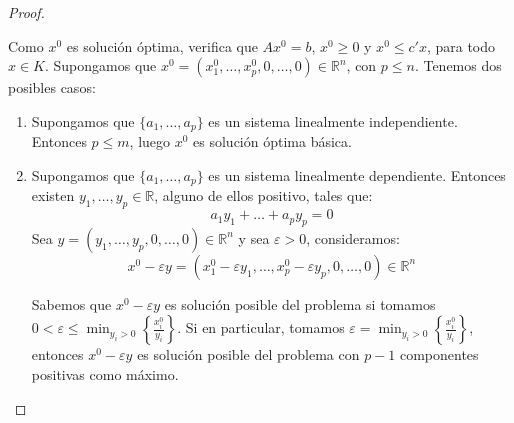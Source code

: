 \begin{proof}
\begin{enumerate}
              Como $x^0$ es solución óptima, verifica que $Ax^0 = b$, $x^0 \geq 0$ y $x^0 \leq c'x$, para todo $x \in K$.
              Supongamos que $x^0 = (x^0_1, \dots, x^0_p, 0, \dots, 0) \in \mathbb{R}^n$, con $p \leq n$.
              Tenemos dos posibles casos:
              \begin{enumerate}
                  \item Supongamos que $\{a_1, \dots, a_p\}$ es un sistema linealmente independiente.
                        Entonces $p \leq m$, luego $x^0$ es solución óptima básica.
                  \item Supongamos que $\{a_1, \dots, a_p\}$ es un sistema linealmente dependiente.
                        Entonces existen $y_1, \dots, y_p \in \mathbb{R}$, alguno de ellos positivo, tales que:
                        $$a_1y_1 + \dots + a_py_p = 0$$
                        Sea $y = (y_1, \dots, y_p, 0, \dots, 0) \in \mathbb{R}^n$ y sea $\varepsilon > 0$, consideramos:
                        $$x^0 - \varepsilon y = (x^0_1 - \varepsilon y_1, \dots, x^0_p - \varepsilon y_p, 0, \dots, 0) \in \mathbb{R}^n$$

                        Sabemos que $x^0 - \varepsilon y$ es solución posible del problema si tomamos $0 < \varepsilon \leq \min_{y_i > 0} \left\{\frac{x^0_i}{y_i}\right\}$.
                        Si en particular, tomamos $\varepsilon = \min_{y_i > 0} \left\{\frac{x^0_i}{y_i}\right\}$, entonces $x^0 - \varepsilon y$ es solución posible del problema con $p-1$ componentes positivas como máximo.


\end{enumerate}
\end{enumerate}
\end{proof}
